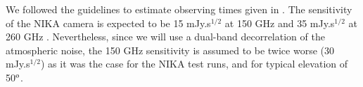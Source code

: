 \documentclass[11pt,a4paper,twoside,graphicx,color]{article}
\newcommand{\ccor}[1]{\textcolor{red}{#1}}
\begin{document}
{%
%
%
%

\vspace{-0.3cm} 
We followed the guidelines to estimate observing times given in \cite{billot2014}. The sensitivity of the NIKA camera is expected to be 15 mJy.s$^{1/2}$ at 150 GHz and 35 mJy.s$^{1/2}$ at 260 GHz \cite{catalano2014}. Nevertheless, since we will use a dual-band decorrelation of the atmospheric noise, the 150 GHz sensitivity is assumed to be twice worse (30 mJy.s$^{1/2}$) as it was the case for the NIKA test runs, and for typical elevation of 50$^{\rm o}$. 

}
\end{document}
